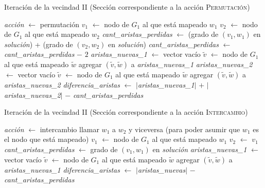 \begin{algorithm}[H]
    \SetAlgoVlined
    \caption{Iteración de la vecindad II (Sección correspondiente a la acción \textsc{Permutación})}
    \label{alg:ej5:vec2:permutacion}
    \textit{acción} $\gets$ \textsf{permutación} \;
    $v_1$ $\gets$ nodo de $G_1$ al que está mapeado $w_1$ \;
    $v_2$ $\gets$ nodo de $G_1$ al que está mapeado $w_2$ \;
    \textit{cant\_aristas\_perdidas} $\gets$ (grado de $(v_1, w_1)$ en \textit{solución}) +
        (grado de $(v_2, w_2)$ en \textit{solución}) \;
     {
        \textit{cant\_aristas\_perdidas} $\gets$ \textit{cant\_aristas\_perdidas} $-$ $2$ \;
    }
    \textit{aristas\_nuevas\_1} $\gets$ vector vacío \;
     {
         {
            $\tilde{v}$ $\gets$ nodo de $G_1$ al que está mapeado $\tilde{w}$ \;
             {
                agregar $(\tilde{v}, \tilde{w})$ a \textit{aristas\_nuevas\_1} \;
            }
        }
    }
    \textit{aristas\_nuevas\_2} $\gets$ vector vacío \;
     {
         {
            $\tilde{v}$ $\gets$ nodo de $G_1$ al que está mapeado $\tilde{w}$ \;
             {
                agregar $(\tilde{v}, \tilde{w})$ a \textit{aristas\_nuevas\_2} \;
            }
        }
    }
    \textit{diferencia\_aristas} $\gets$ $\vert$\textit{aristas\_nuevas\_1}$\vert$ $+$
        $\vert$\textit{aristas\_nuevas\_2}$\vert$ $-$ \textit{cant\_aristas\_perdidas} \;
\end{algorithm}
\bigskip

\begin{algorithm}[H]
    \SetAlgoVlined
    \caption{Iteración de la vecindad II (Sección correspondiente a la acción \textsc{Intercambio})}
    \label{alg:ej5:vec2:intercambio}
    \textit{acción} $\gets$ \textsf{intercambio} \;
     {
        llamar $w_1$ a $w_2$ y viceversa (para poder asumir
            que $w_1$ es el nodo que está mapeado) \;
    }
    $v_1$ $\gets$ nodo de $G_1$ al que está mapeado $w_1$ \;
    $v_2$ $\gets$ $v_1$ \;
    \textit{cant\_aristas\_perdidas} $\gets$ grado de $(v_1, w_1)$ en \textit{solución} \;
    \textit{aristas\_nuevas\_1} $\gets$ vector vacío \;
     {
         {
            $\tilde{v}$ $\gets$ nodo de $G_1$ al que está mapeado $\tilde{w}$ \;
             {
                agregar $(\tilde{v}, \tilde{w})$ a \textit{aristas\_nuevas\_1} \;
            }
        }
    }
    \textit{diferencia\_aristas} $\gets$ $\vert$\textit{aristas\_nuevas}$\vert$
        $-$ \textit{cant\_aristas\_perdidas} \;
\end{algorithm}

